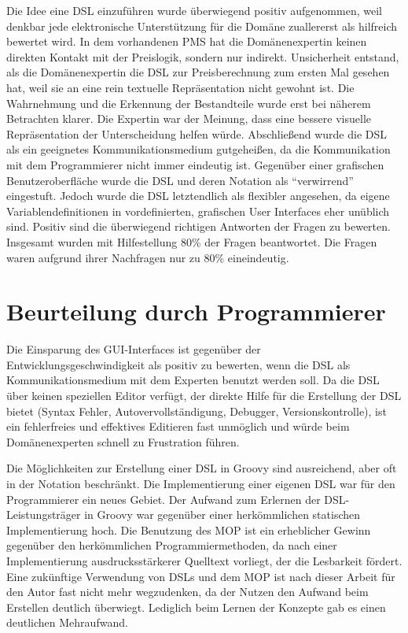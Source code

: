 \documentclass[11pt,english,ngerman, headsepline]{scrreprt}
\begin{document}
Die Idee eine DSL einzuführen wurde überwiegend positiv aufgenommen, weil
denkbar jede elektronische Unterstützung für die Domäne zuallererst als
hilfreich bewertet wird.
In dem vorhandenen PMS hat die Domänenexpertin keinen direkten Kontakt mit der
Preislogik, sondern nur indirekt.
Unsicherheit entstand, als die Domänenexpertin die DSL zur Preisberechnung
 zum ersten Mal gesehen hat, weil sie an eine
rein textuelle Repräsentation nicht gewohnt ist. Die Wahrnehmung
und die Erkennung der Bestandteile wurde erst bei näherem Betrachten klarer. 
Die Expertin war der Meinung, dass eine bessere visuelle Repräsentation der
Unterscheidung helfen würde. Abschließend wurde die DSL als ein geeignetes
Kommunikationsmedium gutgeheißen, da die Kommunikation mit dem Programmierer nicht immer eindeutig ist.
Gegenüber einer grafischen Benutzeroberfläche wurde die DSL und deren Notation
als ``verwirrend'' eingestuft. Jedoch wurde die DSL letztendlich als flexibler
angesehen, da eigene Variablendefinitionen in vordefinierten, grafischen User Interfaces eher unüblich sind.
Positiv sind die überwiegend richtigen Antworten der Fragen zu bewerten.
Insgesamt wurden mit Hilfestellung 80\% der Fragen beantwortet. Die Fragen waren
aufgrund ihrer Nachfragen nur zu 80\% eineindeutig.



\section{Beurteilung durch Programmierer}\label{reaktionProgrammierer}
 
Die Einsparung des GUI-Interfaces ist gegenüber der Entwicklungsgeschwindigkeit
als positiv zu bewerten, wenn die DSL als Kommunikationsmedium mit dem Experten
benutzt werden soll. 
Da die DSL über keinen speziellen Editor verfügt, der direkte Hilfe für die
Erstellung der DSL bietet (Syntax Fehler, Autovervollständigung, Debugger,
Versionskontrolle), ist ein fehlerfreies und effektives Editieren fast unmöglich
und würde beim Domänenexperten schnell zu Frustration führen. 

Die Möglichkeiten zur Erstellung einer DSL in Groovy sind ausreichend, aber oft
in der Notation beschränkt. 
Die Implementierung einer eigenen DSL war für den Programmierer ein neues
Gebiet. Der Aufwand zum Erlernen der DSL-Leistungsträger in Groovy war gegenüber
einer herkömmlichen statischen Implementierung hoch. Die Benutzung des MOP ist ein
erheblicher Gewinn gegenüber den herkömmlichen Programmiermethoden, da nach
einer Implementierung ausdrucksstärkerer Quelltext vorliegt, der die Lesbarkeit
fördert.
Eine zukünftige Verwendung von DSLs und dem MOP ist nach dieser Arbeit für den
Autor fast nicht mehr wegzudenken, da der Nutzen den Aufwand beim 
Erstellen deutlich überwiegt. Lediglich beim Lernen der Konzepte gab es
einen deutlichen Mehraufwand. 
 
\end{document}
